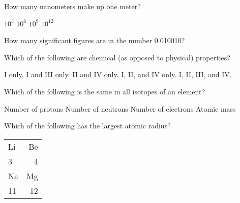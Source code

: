\documentclass[11pt]{exam}
\begin{document}
\begin{questions}

\renewcommand{\theenumi}{\Roman{enumi}}
\renewcommand{\labelenumi}{\theenumi}

\question How many nanometers make up one meter?
\begin{choices}
    \choice $10^3$
    \choice $10^6$
    \choice $10^9$
    \choice $10^{12}$
\end{choices}
\answerline

\question How many significant figures are in the number 0.010010?
\begin{choices}
\end{choices}
\answerline

\question Which of the following are chemical (as opposed to physical) properties?

\hspace{.5cm}

\begin{choices}
    \choice I only.
    \choice I and III only.
    \choice II and IV only.
    \choice I, II, and IV only.
    \choice I, II, III, and IV.
\end{choices}
\answerline

\question Which of the following is the same in all isotopes of an element?

\begin{choices}
    \choice Number of protons
    \choice Number of neutrons
    \choice Number of electrons
    \choice Atomic mass
\end{choices}
\answerline

\pagebreakz
\question Which of the following has the largest atomic radius?

\hspace{.5cm}
\begin{tabular}{ | l | r | }
    \hline
    Li & Be \\ 
    3 & 4 \\ \hline
    Na & Mg \\ 
    11 & 12 \\ \hline
\end{tabular}


\end{questions}
\end{document}
